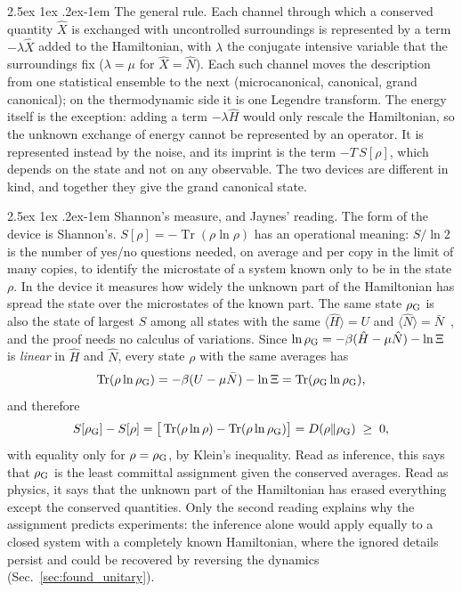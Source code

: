 \documentclass[10pt,a4paper]{article}
\makeatletter
\renewcommand{\paragraph}{\@startsection{paragraph}{4}{\z@}%
  {2.5ex \@plus 1ex \@minus .2ex}{-1em}%
  {\normalfont\fontsize{14pt}{17pt}\selectfont\bfseries}}
\newcommand{\Tr}{\operatorname{Tr}}
\makeatother
\begin{document}
\paragraph{The general rule.}
Each channel through which a conserved quantity $ \hat X $ is exchanged with uncontrolled surroundings is represented by a term $ -\lambda\hat X $ added to the Hamiltonian, with $ \lambda $ the conjugate intensive variable that the surroundings fix ($ \lambda = \mu $ for $ \hat X = \hat N $).
Each such channel moves the description from one statistical ensemble to the next (microcanonical, canonical, grand canonical); on the thermodynamic side it is one Legendre transform.
The energy itself is the exception: adding a term $ -\lambda\hat H $ would only rescale the Hamiltonian, so the unknown exchange of energy cannot be represented by an operator.
It is represented instead by the noise, and its imprint is the term $ -T\,S[\rho] $, which depends on the state and not on any observable.
The two devices are different in kind, and together they give the grand canonical state.

\paragraph{Shannon's measure, and Jaynes' reading.}
The form of the device is Shannon's.
$ S[\rho] = -\Tr(\rho\ln\rho) $ has an operational meaning: $ S/\ln2 $ is the number of yes/no questions needed, on average and per copy in the limit of many copies, to identify the microstate of a system known only to be in the state $ \rho $.
In the device it measures how widely the unknown part of the Hamiltonian has spread the state over the microstates of the known part.
The same state $ \rho_{\rm G} $ is also the state of largest $ S $ among all states with the same $ \langle\hat H\rangle = U $ and $ \langle\hat N\rangle = \bar N $~\cite{Jaynes1957}, and the proof needs no calculus of variations.
Since $ \ln\rho_{\rm G} = -\beta(\hat H - \mu\hat N) - \ln\Xi $ is \emph{linear} in $ \hat H $ and $ \hat N $, every state $ \rho $ with the same averages has
\[
  \Tr(\rho\ln\rho_{\rm G}) = -\beta(U - \mu\bar N) - \ln\Xi = \Tr(\rho_{\rm G}\ln\rho_{\rm G}) ,
\]
and therefore
\[
  S[\rho_{\rm G}] - S[\rho] = \big[\Tr(\rho\ln\rho) - \Tr(\rho\ln\rho_{\rm G})\big]
  = D(\rho \Vert \rho_{\rm G}) \;\geq\; 0 ,
\]
with equality only for $ \rho = \rho_{\rm G} $, by Klein's inequality.
Read as inference, this says that $ \rho_{\rm G} $ is the least committal assignment given the conserved averages.
Read as physics, it says that the unknown part of the Hamiltonian has erased everything except the conserved quantities.
Only the second reading explains why the assignment predicts experiments: the inference alone would apply equally to a closed system with a completely known Hamiltonian, where the ignored details persist and could be recovered by reversing the dynamics (Sec.~\ref{sec:found_unitary}).
\end{document}
